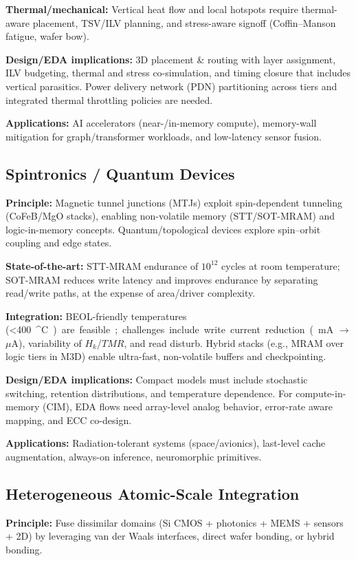 \documentclass[conference]{IEEEtran}
\begin{document}
\textbf{Thermal/mechanical:}
Vertical heat flow and local hotspots require thermal-aware placement, TSV/ILV planning, and stress-aware signoff (Coffin–Manson fatigue, wafer bow).

\textbf{Design/EDA implications:}
3D placement \& routing with layer assignment, ILV budgeting, thermal and stress co-simulation, and timing closure that includes vertical parasitics.
Power delivery network (PDN) partitioning across tiers and integrated thermal throttling policies are needed.

\textbf{Applications:}
AI accelerators (near-/in-memory compute), memory-wall mitigation for graph/transformer workloads, and low-latency sensor fusion.

\subsection{Spintronics / Quantum Devices}
\textbf{Principle:}
Magnetic tunnel junctions (MTJs) exploit spin-dependent tunneling (CoFeB/MgO stacks), enabling non-volatile memory (STT/SOT-MRAM) and logic-in-memory concepts.
Quantum/topological devices explore spin–orbit coupling and edge states.

\textbf{State-of-the-art:}
STT-MRAM endurance of $10^{12}$ cycles at room temperature; SOT-MRAM reduces write latency and improves endurance by separating read/write paths, at the expense of area/driver complexity.

\textbf{Integration:}
BEOL-friendly temperatures (\SI{<400}{^\circ C}) are feasible; challenges include write current reduction (mA $\rightarrow$ $\mu$A), variability of $H_k$/$TMR$, and read disturb.
Hybrid stacks (e.g., MRAM over logic tiers in M3D) enable ultra-fast, non-volatile buffers and checkpointing.

\textbf{Design/EDA implications:}
Compact models must include stochastic switching, retention distributions, and temperature dependence.
For compute-in-memory (CIM), EDA flows need array-level analog behavior, error-rate aware mapping, and ECC co-design.

\textbf{Applications:}
Radiation-tolerant systems (space/avionics), last-level cache augmentation, always-on inference, neuromorphic primitives.

\subsection{Heterogeneous Atomic-Scale Integration}
\textbf{Principle:}
Fuse dissimilar domains (Si CMOS + photonics + MEMS + sensors + 2D) by leveraging van der Waals interfaces, direct wafer bonding, or hybrid bonding.
\end{document}
